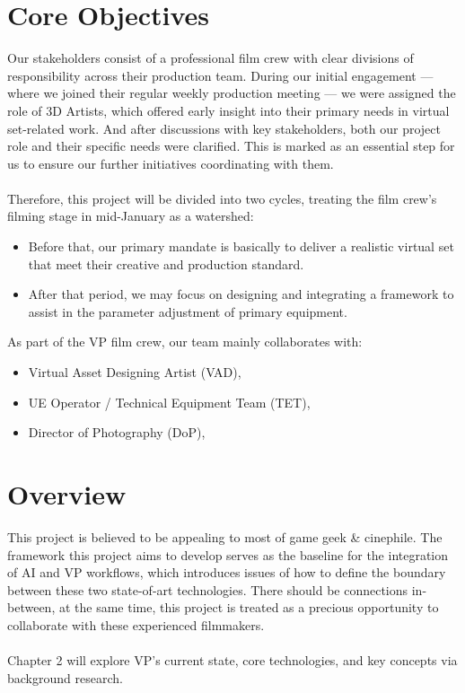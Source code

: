 \documentclass[12pt,a4paper]{report}
\begin{document}
\section{Core Objectives}
Our stakeholders consist of a professional film crew with clear divisions of responsibility across their production team. During our initial engagement — where we joined their regular weekly production meeting — we were assigned the role of 3D Artists, which offered early insight into their primary needs in virtual set-related work. 
And after discussions with key stakeholders, both our project role and their specific needs were clarified. This is marked as an essential step for us to ensure our further initiatives coordinating with them.
\\\\
Therefore, this project will be divided into two cycles, treating the film crew's filming stage in mid-January as a watershed:
\begin{itemize}
    \item Before that, our primary mandate is basically to deliver a realistic virtual set that meet their creative and production standard. 
    \item After that period, we may focus on designing and integrating a framework to assist in the parameter adjustment of primary equipment.
\end{itemize}
As part of the VP film crew, our team mainly collaborates with:
\begin{itemize}
    \item Virtual Asset Designing Artist (VAD),
    \item UE Operator / Technical Equipment Team (TET),
    \item Director of Photography (DoP),
\end{itemize}

\section{Overview}
This project is believed to be appealing to most of game geek \& cinephile. The framework this project aims to develop serves as the baseline for the integration of AI and VP workflows, which introduces issues of how to define the boundary between these two state-of-art technologies. There should be connections in-between, at the same time, this project is treated as a precious opportunity to collaborate with these experienced filmmakers.
\\\\
Chapter 2 will explore VP's current state, core technologies, and key concepts via background research.
\end{document}
